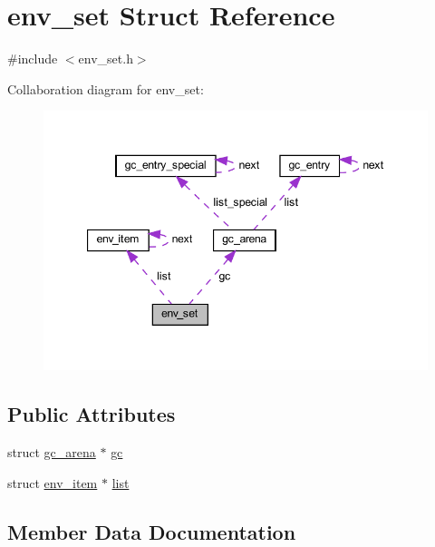\hypertarget{structenv__set}{}\section{env\+\_\+set Struct Reference}
\label{structenv__set}


{\ttfamily \#include $<$env\+\_\+set.\+h$>$}



Collaboration diagram for env\+\_\+set\+:
\nopagebreak
\begin{figure}[H]
\begin{center}
\leavevmode
\includegraphics[width=347pt]{structenv__set__coll__graph}
\end{center}
\end{figure}
\subsection*{Public Attributes}
\begin{DoxyCompactItemize}
\item 
struct \hyperlink{structgc__arena}{gc\+\_\+arena} $\ast$ \hyperlink{structenv__set_ac1f5edea620699ff13763b84a008e365}{gc}
\item 
struct \hyperlink{structenv__item}{env\+\_\+item} $\ast$ \hyperlink{structenv__set_a0d97d5b4606ebd0594ac8c05669f265a}{list}
\end{DoxyCompactItemize}


\subsection{Member Data Documentation}
\hypertarget{structenv__set_ac1f5edea620699ff13763b84a008e365}{}
